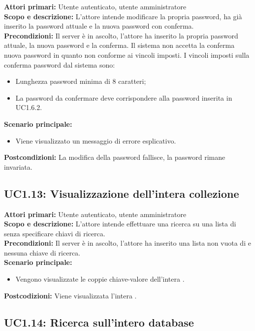 \documentclass{scalatekids-article}
\begin{document}
\textbf{Attori primari:} Utente autenticato, utente amministratore\\
\textbf{Scopo e descrizione:} L'attore intende modificare la propria password, ha già inserito la password attuale e la nuova password con conferma.\\
\textbf{Precondizioni:} Il server è in ascolto, l'attore ha inserito la propria password attuale, la nuova password e la conferma. Il sistema non accetta la conferma nuova password in quanto non conforme ai
vincoli imposti. I vincoli imposti sulla conferma password dal sistema sono:
\begin{itemize}
\item Lunghezza password minima di 8 caratteri;
\item La password da confermare deve corrispondere alla password inserita in UC1.6.2.
\end{itemize}
\textbf{Scenario principale:}
\begin{itemize}
\item Viene visualizzato un messaggio di errore esplicativo.
\end{itemize}
\textbf{Postcondizioni:} La modifica della password fallisce, la password rimane invariata.

\subsection{UC1.13: Visualizzazione dell'intera collezione}

\textbf{Attori primari:} Utente autenticato, utente amministratore\\
\textbf{Scopo e descrizione:} L'attore intende effettuare una ricerca su una lista di  senza specificare chiavi di ricerca.\\
\textbf{Precondizioni:} Il server è in ascolto, l'attore ha inserito una lista non vuota di  e nessuna chiave di ricerca.\\
\textbf{Scenario principale:}
\begin{itemize}
\item Vengono visualizzate le coppie chiave-valore dell'intera .
\end{itemize}
\textbf{Postcodizioni:} Viene visualizzata l'intera .

\subsection{UC1.14: Ricerca sull'intero database}
\end{document}
